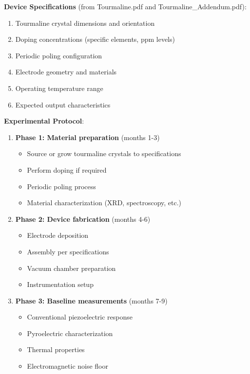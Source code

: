 \textbf{Device Specifications} (from Tourmaline.pdf and Tourmaline\_Addendum.pdf):
\begin{enumerate}
    \item Tourmaline crystal dimensions and orientation
    \item Doping concentrations (specific elements, ppm levels)
    \item Periodic poling configuration
    \item Electrode geometry and materials
    \item Operating temperature range
    \item Expected output characteristics
\end{enumerate}

\textbf{Experimental Protocol}:
\begin{enumerate}
    \item \textbf{Phase 1: Material preparation} (months 1-3)
    \begin{itemize}
        \item Source or grow tourmaline crystals to specifications
        \item Perform doping if required
        \item Periodic poling process
        \item Material characterization (XRD, spectroscopy, etc.)
    \end{itemize}

    \item \textbf{Phase 2: Device fabrication} (months 4-6)
    \begin{itemize}
        \item Electrode deposition
        \item Assembly per specifications
        \item Vacuum chamber preparation
        \item Instrumentation setup
    \end{itemize}

    \item \textbf{Phase 3: Baseline measurements} (months 7-9)
    \begin{itemize}
        \item Conventional piezoelectric response
        \item Pyroelectric characterization
        \item Thermal properties
        \item Electromagnetic noise floor
    \end{itemize}


\end{enumerate}
